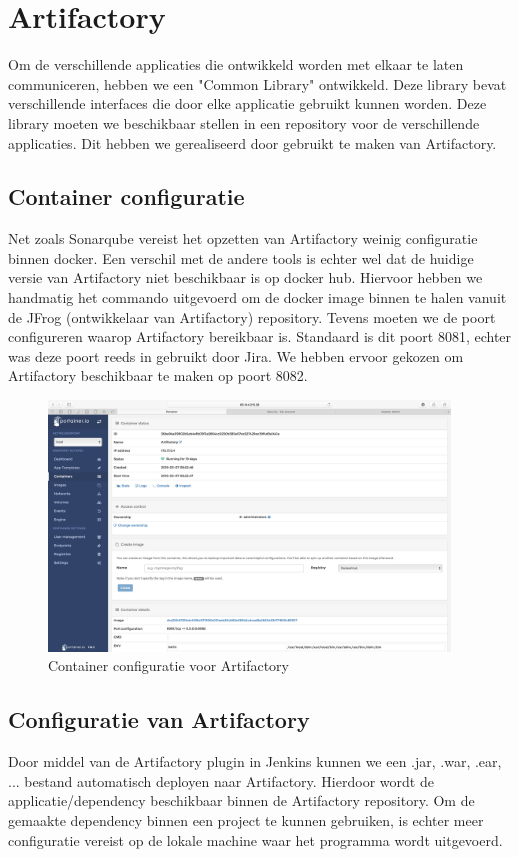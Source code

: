\chapter{Artifactory}
Om de verschillende applicaties die ontwikkeld worden met elkaar te laten communiceren, hebben we een "Common Library" ontwikkeld. Deze library bevat verschillende interfaces die door elke applicatie gebruikt kunnen worden.
Deze library moeten we beschikbaar stellen in een repository voor de verschillende applicaties. Dit hebben we gerealiseerd door gebruikt te maken van Artifactory.

\section{Container configuratie}
Net zoals Sonarqube vereist het opzetten van Artifactory weinig configuratie binnen docker. Een verschil met de andere tools is echter wel dat de huidige versie van Artifactory niet beschikbaar is op docker hub. Hiervoor hebben we handmatig het commando uitgevoerd om de docker image binnen te halen vanuit de JFrog (ontwikkelaar van Artifactory) repository.
\newline
Tevens moeten we de poort configureren waarop Artifactory bereikbaar is. Standaard is dit poort 8081, echter was deze poort reeds in gebruikt door Jira. We hebben ervoor gekozen om Artifactory beschikbaar te maken op poort 8082.

\begin{figure}[H]
	\centering
	\includegraphics[width=0.95\textwidth]{img/ArtifactoryContainerDetails.png}
	\caption{Container configuratie voor Artifactory}
	\label{fig:ArtifactoryContainerDetails}
\end{figure}

\section{Configuratie van Artifactory}
Door middel van de Artifactory plugin in Jenkins kunnen we een .jar, .war, .ear, ... bestand automatisch deployen naar Artifactory. Hierdoor wordt de applicatie/dependency beschikbaar binnen de Artifactory repository. Om de gemaakte dependency binnen een project te kunnen gebruiken, is echter meer configuratie vereist op de lokale machine waar het programma wordt uitgevoerd.

